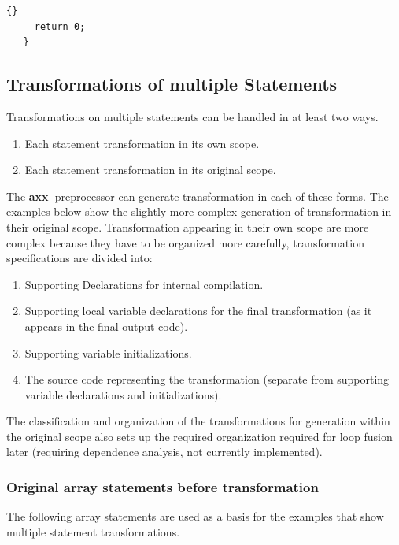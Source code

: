\documentclass[10pt]{article}
\newcommand{\axx}{{\bf axx\ }}
\begin{document}
\begin{lstlisting}{}
     return 0;
   } 

\end{lstlisting}

\subsection{Transformations of multiple Statements}

    Transformations on multiple statements can be handled in at least two ways.
\begin{enumerate}
   \item Each statement transformation in its own scope.
   \item Each statement transformation in its original scope.
\end{enumerate}

   The \axx preprocessor can generate transformation in each of these forms.  The examples below
show the slightly more complex generation of transformation in their original scope.  Transformation
appearing in their own scope are more complex because they have to be organized more carefully,
transformation specifications are divided into:
\begin{enumerate}
   \item Supporting Declarations for internal compilation.

   \item Supporting local variable declarations for the final transformation (as it appears in the
   final output code).

   \item Supporting variable initializations.

   \item The source code representing the transformation (separate from supporting variable
   declarations and initializations).
\end{enumerate}

The classification and organization of the transformations for generation within the original scope
also sets up the required organization required for loop fusion later (requiring dependence
analysis, not currently implemented).

\subsubsection{Original array statements before transformation}

The following array statements are used as a basis for the examples that show multiple statement
transformations.
\end{document}
